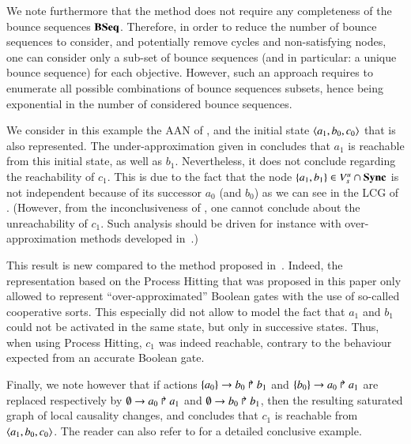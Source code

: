 We note furthermore that the method does not require any completeness of the bounce sequences
$\mathbf{BSeq}$.
Therefore, in order to reduce the number of bounce sequences to consider, and potentially remove
cycles and non-satisfying nodes,
one can consider only a sub-set of bounce sequences
(and in particular: a unique bounce sequence) for each objective.
However, such an approach requires to enumerate all possible combinations of bounce sequences
subsets, hence being exponential in the number of considered bounce sequences.



\begin{example}
  We consider in this example the AAN of ,
  and the initial state $\mbox{$\langle a_1, b_0, c_0 \rangle$}$
  that is also represented.
  The under-approximation given in 
  concludes that $a_1$ is reachable from this initial state, as well as $b_1$.
  Nevertheless, it does not conclude regarding the reachability of $c_1$.
  This is due to the fact that the node $\{ a_1, b_1 \} \in {V_s^u} \cap \mathbf{Sync}$
  is not independent because of its successor $a_0$ (and $b_0$)
  as we can see in the LCG of .
  (However, from the inconclusiveness of ,
  one cannot conclude about the unreachability of $c_1$.
  Such analysis should be driven for instance
  with over-approximation methods developed in~\cite{PMR12-MSCS}.)
  
  This result is new compared to the method proposed in~\cite{PMR12-MSCS}.
  Indeed, the representation based on the Process Hitting that was proposed
  in this paper only allowed to represent “over-approximated” Boolean gates
  with the use of so-called cooperative sorts.
  This especially did not allow to model the fact that $a_1$ and $b_1$ could not
  be activated in the same state, but only in successive states.
  Thus, when using Process Hitting, $c_1$ was indeed reachable,
  contrary to the behaviour expected from an accurate Boolean gate.
  
  Finally, we note however that
  if actions $\{a_0\}\rightarrow b_0\Rsh b_1$ and $\{b_0\}\rightarrow a_0\Rsh a_1$
  are replaced respectively by
  $\emptyset\rightarrow a_0\Rsh a_1$ and $\emptyset\rightarrow b_0\Rsh b_1$,
  then the resulting saturated graph of local causality changes, and
   concludes that $c_1$ is reachable from $\mbox{$\langle a_1, b_0, c_0 \rangle$}$.
  The reader can also refer to 
  for a detailed conclusive example.

\begin{figure}[tp]
  \centering
\end{figure}
\end{example}
